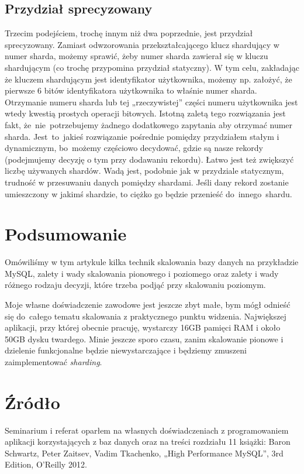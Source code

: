 \documentclass[a4paper,12pt]{article}
\begin{document}
\subsection{Przydział sprecyzowany}

Trzecim podejściem, trochę innym niż dwa poprzednie, jest przydział sprecyzowany. Zamiast odwzorowania przekształcającego klucz shardujący w numer sharda, możemy sprawić, żeby numer sharda zawierał się w kluczu shardującym (co trochę przypomina przydział statyczny). W tym celu, zakładając że kluczem shardującym jest identyfikator użytkownika, możemy np. założyć, że pierwsze 6 bitów identyfikatora użytkownika to właśnie numer sharda. Otrzymanie numeru sharda lub tej „rzeczywistej” części numeru użytkownika jest wtedy kwestią prostych operacji bitowych. Istotną zaletą tego rozwiązania jest fakt, że~nie~potrzebujemy żadnego dodatkowego zapytania aby otrzymać numer sharda. Jest~to~jakieś rozwiązanie pośrednie pomiędzy przydziałem stałym i dynamicznym, bo~możemy częściowo decydować, gdzie są nasze rekordy (podejmujemy decyzję o tym przy dodawaniu rekordu). Łatwo jest też zwiększyć liczbę używanych shardów. Wadą jest, podobnie jak w przydziale statycznym, trudność w przesuwaniu danych pomiędzy shardami. Jeśli dany rekord zostanie umieszczony w jakimś shardzie, to ciężko go będzie przenieść do~innego~shardu.

\section{Podsumowanie}

Omówiliśmy w tym artykule kilka technik skalowania bazy danych na przykładzie MySQL, zalety i wady skalowania pionowego i poziomego oraz zalety i wady różnego rodzaju decyzji, które trzeba podjąć przy skalowaniu poziomym.

Moje własne doświadczenie zawodowe jest jeszcze zbyt małe, bym mógł odnieść się do~całego tematu skalowania z praktycznego punktu widzenia. Największej aplikacji, przy której obecnie pracuję, wystarczy 16GB pamięci RAM i około 50GB dysku twardego. Minie jeszcze sporo czasu, zanim skalowanie pionowe i dzielenie funkcjonalne będzie niewystarczające i będziemy zmuszeni zaimplementować \textit{sharding}.

\section{Źródło}

Seminarium i referat oparłem na własnych doświadczeniach z programowaniem aplikacji korzystających z baz danych oraz na treści rozdziału 11 książki: Baron Schwartz, Peter Zaitsev, Vadim Tkachenko, „High Performance MySQL”, 3rd Edition, O'Reilly 2012.
\end{document}
